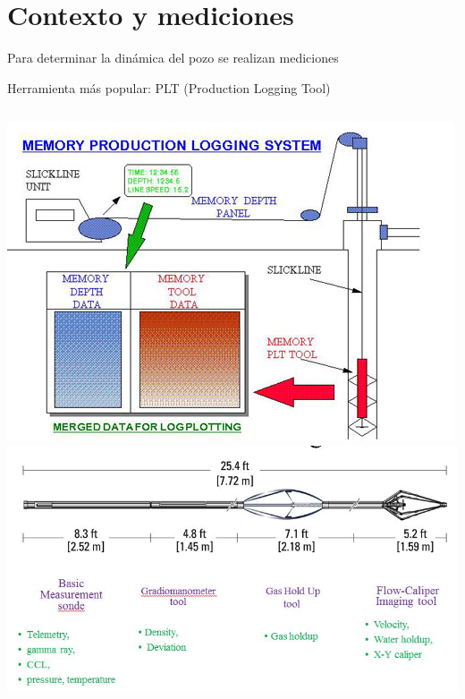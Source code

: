 \documentclass[presentation]{beamer}
\begin{document}
\section{Contexto y mediciones}
\begin{frame}{Para determinar la dinámica del pozo se realizan mediciones}
	\begin{block}{}
		Herramienta más popular: PLT (Production Logging Tool)
	\end{block} 
	\begin{columns}
	\includegraphics[scale=2, width=\textwidth]{./plt.png}
	\includegraphics[scale=2, width=\textwidth]{./plt2.png}
	

\end{columns}
\end{frame}
\end{document}

